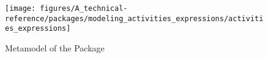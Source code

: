 %
%

\begin{figure}[htb]
  \centering
  \texttt{[image: figures/A\_technical-reference/packages/modeling\_activities\_expressions/activities\_expressions]}
  \caption{Metamodel of the  Package}
  \label{fig:MM:activities:expressions}
\end{figure}